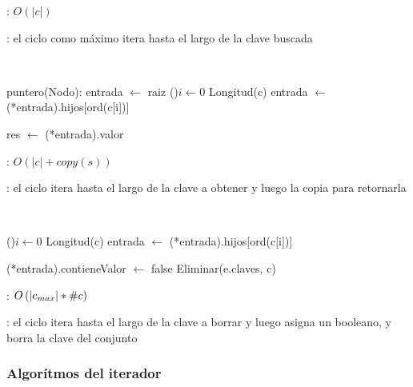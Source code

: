 \complejidad: $O(|c|)$

\justifcomp: el ciclo como máximo itera hasta el largo de la clave buscada

~

\begin{algorithm}[H]
	\NoCaptionOfAlgo
	\caption{}
	puntero(Nodo): entrada $\leftarrow$ raiz 
	\For(){$i \leftarrow 0$ \KwTo Longitud(c)}{
		entrada $\leftarrow$ (*entrada).hijos[ord(c[i])] 
	}

	res $\leftarrow$ (*entrada).valor 
\end{algorithm}

\complejidad: $O(|c| + copy(s))$

\justifcomp: el ciclo itera hasta el largo de la clave a obtener y luego la copia para retornarla

~

\begin{algorithm}[H]
	\NoCaptionOfAlgo
	\caption{}
	\For(){$i \leftarrow 0$ \KwTo Longitud(c)}{
		entrada $\leftarrow$ (*entrada).hijos[ord(c[i])] 
	}

	(*entrada).contieneValor $\leftarrow$ false 
	Eliminar(e.claves, c) \OdeLinea{\compConjLineal}
\end{algorithm}

\complejidad: $O\left(|c_{max}| * \#c\right)$

\justifcomp: el ciclo itera hasta el largo de la clave a borrar y luego asigna un booleano, y borra la clave del conjunto

\subsubsection{Algorítmos del iterador}

